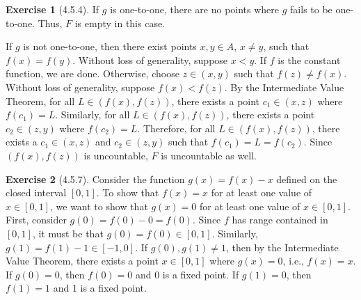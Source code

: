\documentclass{amsart}
\theoremstyle{definition}
\newtheorem{exercise}{Exercise}
\begin{document}
\begin{exercise}[4.5.4]
  If $g$ is one-to-one, there are no points where $g$ fails to be one-to-one.
  Thus, $F$ is empty in this case.

  If $g$ is not one-to-one, then there exist points $x, y \in A$, $x \neq y$,
  such that $f(x) = f(y)$. Without loss of generality, suppose $x < y$. If $f$
  is the constant function, we are done. Otherwise, choose $z \in (x, y)$ such
  that $f(z) \neq f(x)$. Without loss of generality, suppose $f(x) < f(z)$. By
  the Intermediate Value Theorem, for all $L \in (f(x), f(z))$, there exists a
  point $c_1 \in (x, z)$ where $f(c_1) = L$. Similarly, for all $L \in (f(x),
  f(z))$, there exists a point $c_2 \in (z, y)$ where $f(c_2) = L$. Therefore,
  for all $L \in (f(x), f(z))$, there exists a $c_1 \in (x, z)$ and $c_2 \in (z,
  y)$ such that $f(c_1) = L = f(c_2)$. Since $(f(x), f(z))$ is uncountable, $F$
  is uncountable as well.
\end{exercise}

\begin{exercise}[4.5.7]
  Consider the function $g(x) = f(x) - x$ defined on the closed interval $[0,
  1]$. To show that $f(x) = x$ for at least one value of $x \in [0, 1]$, we want
  to show that $g(x) = 0$ for at least one value of $x \in [0, 1]$. First,
  consider $g(0) = f(0) - 0 = f(0)$. Since $f$ has range contained in $[0, 1]$,
  it must be that $g(0) = f(0) \in [0, 1]$. Similarly, $g(1) = f(1) - 1 \in [-1,
  0]$. If $g(0), g(1) \neq 1$, then by the Intermediate Value Theorem, there
  exists a point $x \in [0, 1]$ where $g(x) = 0$, i.e., $f(x) = x$. If $g(0) =
  0$, then $f(0) = 0$ and 0 is a fixed point. If $g(1) = 0$, then $f(1) = 1$ and
  1 is a fixed point.
\end{exercise}
\end{document}
